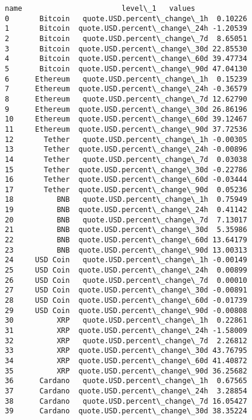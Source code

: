 \documentclass[11pt]{article}
\makeatletter
\newcommand{\boxspacing}{\kern\kvtcb@left@rule\kern\kvtcb@boxsep}
\newcommand{\prompt}[4]{
        {\ttfamily\llap{{\color{#2}[#3]:\hspace{3pt}#4}}\vspace{-\baselineskip}}
    }
\makeatother
\begin{document}
            \begin{tcolorbox}[breakable, size=fbox, boxrule=.5pt, pad at break*=1mm, opacityfill=0]
\prompt{Out}{outcolor}{55}{\boxspacing}
\begin{Verbatim}[commandchars=\\\{\}]
           name                       level\_1   values
0       Bitcoin   quote.USD.percent\_change\_1h  0.10226
1       Bitcoin  quote.USD.percent\_change\_24h -1.20539
2       Bitcoin   quote.USD.percent\_change\_7d  8.65051
3       Bitcoin  quote.USD.percent\_change\_30d 22.85530
4       Bitcoin  quote.USD.percent\_change\_60d 39.47734
5       Bitcoin  quote.USD.percent\_change\_90d 47.04130
6      Ethereum   quote.USD.percent\_change\_1h  0.15239
7      Ethereum  quote.USD.percent\_change\_24h -0.36579
8      Ethereum   quote.USD.percent\_change\_7d 12.62790
9      Ethereum  quote.USD.percent\_change\_30d 26.86196
10     Ethereum  quote.USD.percent\_change\_60d 39.12467
11     Ethereum  quote.USD.percent\_change\_90d 37.72536
12       Tether   quote.USD.percent\_change\_1h -0.00305
13       Tether  quote.USD.percent\_change\_24h -0.00896
14       Tether   quote.USD.percent\_change\_7d  0.03038
15       Tether  quote.USD.percent\_change\_30d -0.22786
16       Tether  quote.USD.percent\_change\_60d -0.03444
17       Tether  quote.USD.percent\_change\_90d  0.05236
18          BNB   quote.USD.percent\_change\_1h  0.75949
19          BNB  quote.USD.percent\_change\_24h  0.41142
20          BNB   quote.USD.percent\_change\_7d  7.13017
21          BNB  quote.USD.percent\_change\_30d  5.35986
22          BNB  quote.USD.percent\_change\_60d 13.64179
23          BNB  quote.USD.percent\_change\_90d 13.00313
24     USD Coin   quote.USD.percent\_change\_1h -0.00149
25     USD Coin  quote.USD.percent\_change\_24h  0.00899
26     USD Coin   quote.USD.percent\_change\_7d  0.00010
27     USD Coin  quote.USD.percent\_change\_30d -0.00891
28     USD Coin  quote.USD.percent\_change\_60d -0.01739
29     USD Coin  quote.USD.percent\_change\_90d -0.00808
30          XRP   quote.USD.percent\_change\_1h  0.22861
31          XRP  quote.USD.percent\_change\_24h -1.58009
32          XRP   quote.USD.percent\_change\_7d  2.26812
33          XRP  quote.USD.percent\_change\_30d 43.76795
34          XRP  quote.USD.percent\_change\_60d 41.40872
35          XRP  quote.USD.percent\_change\_90d 36.25682
36      Cardano   quote.USD.percent\_change\_1h  0.67565
37      Cardano  quote.USD.percent\_change\_24h  3.28854
38      Cardano   quote.USD.percent\_change\_7d 16.05427
39      Cardano  quote.USD.percent\_change\_30d 38.35224

\end{Verbatim}
\end{tcolorbox}
\end{document}
